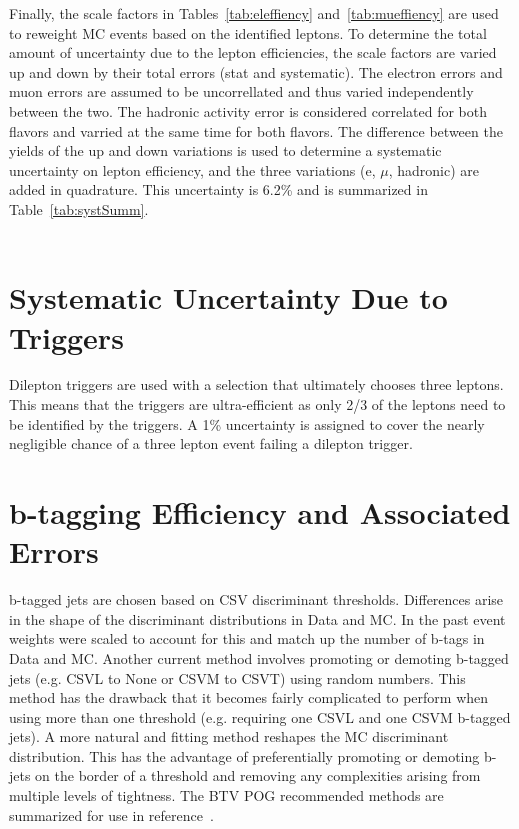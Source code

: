 Finally, the scale factors in Tables~\ref{tab:eleffiency} and~\ref{tab:mueffiency} are used to reweight MC events based on the identified leptons. To determine the total amount of uncertainty due to the lepton efficiencies, the scale factors are varied up and down by their total errors (stat and systematic). The electron errors and muon errors are assumed to be uncorrellated and thus varied independently between the two. The hadronic activity error is considered correlated for both flavors and varried at the same time for both flavors. The difference between the yields of the up and down variations is used to determine a systematic uncertainty on lepton efficiency, and the three variations (e, $\mu$, hadronic) are added in quadrature. This uncertainty is 6.2\% and is summarized in Table~\ref{tab:systSumm}.\\\\





\section{Systematic Uncertainty Due to Triggers}   
\label{sec:trigger_syst}
Dilepton triggers are used with a selection that ultimately chooses three leptons. This means that the triggers are ultra-efficient as only 2/3 of the leptons need to be identified by the triggers. A 1\% uncertainty is assigned to cover the nearly negligible chance of a three lepton event failing a dilepton trigger.

\section{b-tagging Efficiency and Associated Errors}
\label{sec:btag_syst}
b-tagged jets are chosen based on CSV discriminant thresholds. Differences arise in the shape of the discriminant distributions in Data and MC. In the past event weights were scaled to account for this and match up the number of b-tags in Data and MC. Another current method involves promoting or demoting b-tagged jets (e.g. CSVL to None or CSVM to CSVT) using random numbers. This method has the drawback that it becomes fairly complicated to perform when using more than one threshold (e.g. requiring one CSVL and one CSVM b-tagged jets). A more natural and fitting method reshapes the MC discriminant distribution. This has the advantage of preferentially promoting or demoting b-jets on the border of a threshold and removing any complexities arising from multiple levels of tightness. The BTV POG recommended methods are summarized for use in reference~\cite{bTagSF}.\\


